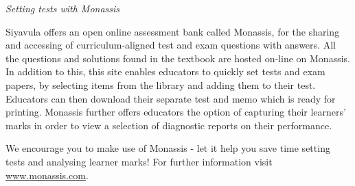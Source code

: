 
{\normalfont\sffamily\fontsize{22}\normalfont\itshape Setting tests with Monassis} \par

{\Large
Siyavula offers an open online assessment bank called Monassis, for the sharing and accessing of
curriculum-aligned test and exam questions with answers. All the questions and solutions found in the
textbook are hosted on-line on Monassis. In addition to this, this site enables educators to quickly set tests
and exam papers, by selecting items from the library and adding them to their test. Educators can then
download their separate test and memo which is ready for printing. Monassis further offers educators the
option of capturing their learners' marks in order to view a selection of diagnostic reports on their
performance.
\begin{figure}[H]
\begin{center}
\end{center}
\end{figure}




We encourage you to make use of Monassis - let it help you save time setting tests and analysing learner marks! For further information visit \underline{www.monassis.com}.






}
